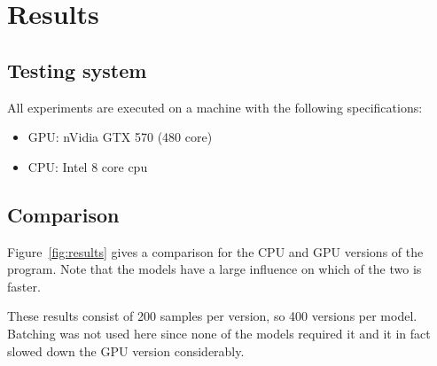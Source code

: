 \section{Results}
\subsection{Testing system} \label{sec:system}
All experiments are executed on a machine with the following specifications:
\begin{itemize}
  \item GPU: nVidia GTX 570 (480 core)
  \item CPU: Intel 8 core cpu
\end{itemize}

\subsection{Comparison}
	Figure~\ref{fig:results} gives a comparison for the CPU and GPU versions of the program.
	Note that the models have a large influence on which of the two is faster.
	
	These results consist of 200 samples per version, so 400 versions per model.
	Batching was not used here since none of the models required it and it in fact slowed down the GPU version considerably.
	
